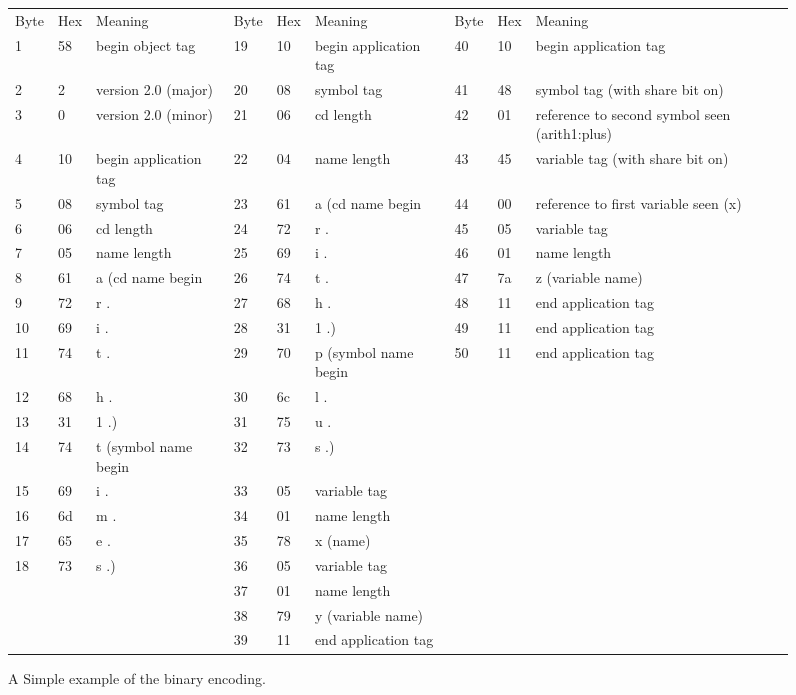 \begin{figure}\centering\footnotesize
\begin{tabular}{lllllllll}
	    Byte &Hex &Meaning &
	    Byte &Hex &Meaning &
	    Byte &Hex &Meaning\\
	    1 &58 &begin object tag &
	    19 &10 &begin application tag &
	    40 &10 &begin application tag\\
	    2 &2 & version 2.0 (major) &
	    20 &08 &symbol tag &
	    41 &48 &symbol tag (with share bit on) \\
	    3 &0 & version 2.0 (minor) &
	    21 &06 &cd length &
	    42 &01 &reference to second symbol seen (arith1:plus)\\
	    4 &10 &begin application tag &
	    22 &04 &name length &
	    43 &45 &variable tag (with share bit on)  \\
	    5 &08 &symbol tag &
	    23 &61 &a (cd name begin &
	    44 &00 &reference to first variable seen (x) \\
	    6 &06 &cd length  &
	    24 &72 &r  . &
	    45 &05 &variable tag \\
	    7 &05 &name length &
	    25 &69 &i  . &
	    46 &01 &name length\\
	    8 &61 &a (cd name begin &
	    26 &74 &t  . &
	    47 &7a &z (variable name) \\
	    9 &72 &r  . &
	    27 &68 &h  . &
	    48 &11 &end application tag\\
	    10 &69 &i  . &
	    28 &31 &1  .) &
	    49 &11 &end application tag \\
	    11 &74 &t  . &
	    29 &70 &p (symbol name begin &
	    50 &11 &end application tag\\
	    12 &68 &h  . &
	    30 &6c &l  . &
            &&\\               
	    13 &31 &1  .) &
	    31 &75 &u  .  &
             &&\\
	    14 &74 &t (symbol name begin &
	    32 &73 &s  .)  &
            &&\\
	    15 &69 &i  . &
	    33 &05 &variable tag &
            && \\
	    16 &6d &m  . &
	    34 &01 &name length  &
            && \\
	    17 &65 &e  . &
	    35 &78 &x (name)  &
            &&\\
	    18 &73 &s  .) &
	    36 &05 &variable tag  &
            && \\
	    &&&
	    37 &01 &name length  &
	    &&\\
            &&&
	    38 &79 &y (variable name)  &
	    &&\\
            &&&
	    39 &11 &end application tag  &
	    &&\\
\end{tabular}
\caption{A Simple example of the \OM binary encoding.}\label{fig_bin-enc_ex}
\end{figure}

